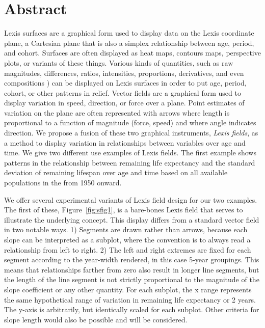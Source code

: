 \documentclass{article}
\begin{document}
\section*{Abstract}
Lexis surfaces are a graphical form used to display data on the Lexis coordinate
plane, a Cartesian plane that is also a simplex relationship between age,
period, and cohort. Surfaces are often displayed as heat maps, contours maps,
perspective plots, or variants of these things. Various kinds of
quantities, such as raw magnitudes, differences, ratios, intensities,
proportions, derivatives, and even compositions \citep{scholey2017visualizing}) can be displayed on Lexis 
surfaces in order to put age, period, cohort, or other patterns in relief. 
Vector fields are a graphical form used to display variation in speed,
direction, or force over a plane. Point estimates of variation on the plane are
often represented with arrows where length is proportional to a function of
magnitude (force, speed) and where angle indicates direction. We propose a
fusion of these two graphical instruments, \emph{Lexis fields}, as a method to
display variation in relationships between variables over age and time. We
give two different use examples of Lexis fields. The first example
shows patterns in the relationship between remaining life expectancy and
the standard deviation of remaining lifespan over age and time based on all
available populations in the \citet{HMD} from 1950 onward. 



We offer several experimental variants of Lexis field design for our two
examples. The first of these, Figure~\ref{fig:sfig1}, is a bare-bones Lexis field that serves to illustrate the underlying concept. This display differs from a standard vector field in two notable ways. 1) Segments are drawn rather than arrows, because each slope can be
interpreted as a subplot, where the convention is to always read a
relationship from left to right. 2) The left and right extremes are fixed for
each segment according to the year-width rendered, in this case 5-year
groupings. This means that relationships farther from zero also result in longer
line segments, but the length of the line segment is not strictly proportional
to the magnitude of the slope coefficient or any other quantity. For each
subplot, the x range represents the same hypothetical range of
variation in remaining life expectancy or 2 years. The y-axis is arbitrarily,
but identically scaled for each subplot. Other criteria for slope length would
also be possible and will be considered.
\end{document}
